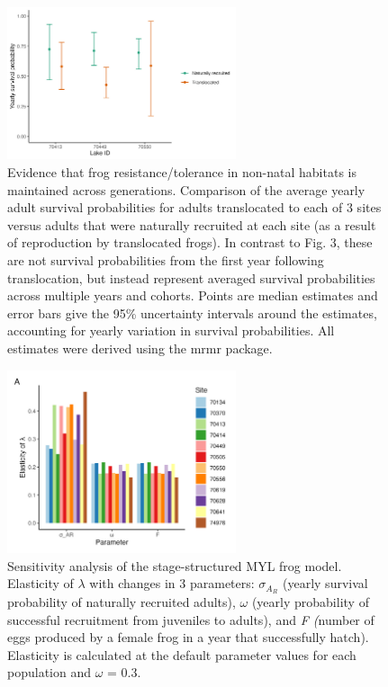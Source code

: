 \documentclass[9pt,twoside,lineno]{pnas-new}
\begin{document}
\begin{figure}

{\centering \includegraphics[width=0.60\textwidth]{figures/compare_surv_probs.jpg}

}

\caption{\label{fig-compare_surv_probs}Evidence that frog
resistance/tolerance in non-natal habitats is maintained across
generations. Comparison of the average yearly adult survival
probabilities for adults translocated to each of 3 sites versus adults
that were naturally recruited at each site (as a result of reproduction
by translocated frogs). In contrast to
Fig. 3, these are not survival
probabilities from the first year following translocation, but instead
represent averaged survival probabilities across multiple years and
cohorts. Points are median estimates and error bars give the 95\%
uncertainty intervals around the estimates, accounting for yearly
variation in survival probabilities. All estimates were derived using
the mrmr package.}

\end{figure}\clearpage

\begin{figure}

{\centering \includegraphics[width=0.60\textwidth]{figures/pop_viability_figures_for_supp.jpg}

}

\caption{\label{fig-viability-supp}Sensitivity analysis of the
stage-structured MYL frog model. Elasticity of \(\lambda\) with changes
in 3 parameters: \(\sigma_{A_R}\) (yearly survival probability of
naturally recruited adults), \(\omega\) (yearly probability of
successful recruitment from juveniles to adults), and \emph{F (}number
of eggs produced by a female frog in a year that successfully hatch).
Elasticity is calculated at the default parameter values for each
population and \(\omega\) = 0.3.}

\end{figure}\clearpage
\end{document}
